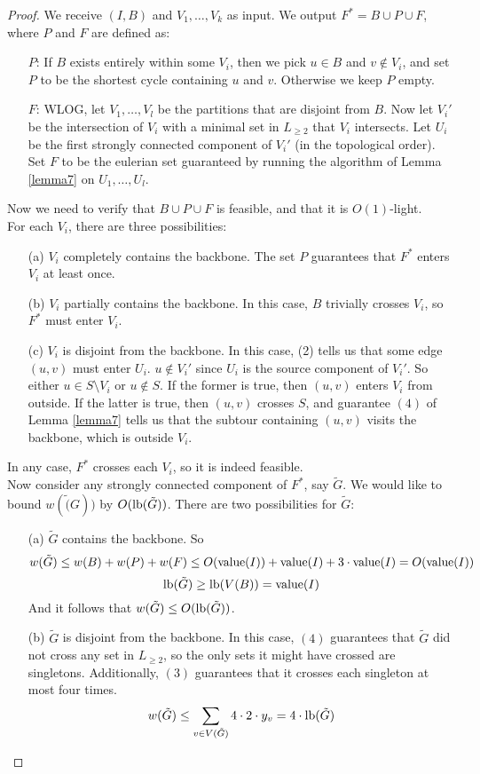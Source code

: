 \documentclass[./main.tex]{subfiles}
\begin{document}
	\begin{proof}
		We receive $(I,B)$ and $V_1,\ldots,V_k$ as input. We output $F^*=B\cup P\cup F$, where $P$ and $F$ are defined as:
		\begin{enumerate}
			\item[$P$:] If $B$ exists entirely within some $V_i$, then we pick $u\in B$ and $v\notin V_i$, and set $P$ to be the shortest cycle containing $u$ and $v$. Otherwise we keep $P$ empty.
			\item[$F$:] WLOG, let $V_1,\ldots,V_l$ be the partitions that are disjoint from $B$. Now let $V_i'$ be the intersection of $V_i$ with a minimal set in $L_{\geq 2}$ that $V_i$ intersects. Let $U_i$ be the first strongly connected component of $V_i'$ (in the topological order). Set $F$ to be the eulerian set guaranteed by running the algorithm of Lemma \ref{lemma7} on $U_1,\ldots,U_l$.
		\end{enumerate}\vspace{2mm}
		Now we need to verify that $B\cup P\cup F$ is feasible, and that it is $O(1)$-light.
		\\For each $V_i$, there are three possibilities:
		\begin{enumerate}
			\item[(a)] $V_i$ completely contains the backbone. The set $P$ guarantees that $F^*$ enters $V_i$ at least once.
			\item[(b)] $V_i$ partially contains the backbone. In this case, $B$ trivially crosses $V_i$, so $F^*$ must enter $V_i$.
			\item[(c)] $V_i$ is disjoint from the backbone. In this case, (2) tells us that some edge $(u,v)$ must enter $U_i$. $u\notin V_i'$ since $U_i$ is the source component of $V_i'$. So either $u\in S\setminus V_i$ or $u\notin S$. If the former is true, then $(u,v)$ enters $V_i$ from outside. If the latter is true, then $(u,v)$ crosses $S$, and guarantee $(4)$ of Lemma \ref{lemma7} tells us that the subtour containing $(u,v)$ visits the backbone, which is outside $V_i$.
		\end{enumerate}
		In any case, $F^*$ crosses each $V_i$, so it is indeed feasible.\vspace{2mm}
		\\Now consider any strongly connected component of $F^*$, say $\tilde{G}$. We would like to bound $w(\tilde(G))$ by $O(\textup{lb}(\tilde{G}))$. There are two possibilities for $\tilde{G}$:
		\begin{enumerate}
			\item[(a)] $\tilde{G}$ contains the backbone. So $$w(\tilde{G})\leq w(B) + w(P) + w(F)\leq O(\textup{value}(I)) + \textup{value}(I) + 3\cdot\textup{value}(I) = O(\textup{value}(I))$$
			      $$\textup{lb}(\tilde{G})\geq \textup{lb}(V(B)) = \textup{value}(I)$$
			      And it follows that $w(\tilde{G})\leq O(\textup{lb}(\tilde{G}))$.
			\item[(b)] $\tilde{G}$ is disjoint from the backbone. In this case, $(4)$ guarantees that $\tilde{G}$ did not cross any set in $L_{\geq 2}$, so the only sets it might have crossed are singletons. Additionally, $(3)$ guarantees that it crosses each singleton at most four times. $$w(\tilde{G})\leq \sum_{v\in V(\tilde{G})}4\cdot 2\cdot y_v = 4\cdot\textup{lb}(\tilde{G})$$
		\end{enumerate}
	\end{proof}
\end{document}
